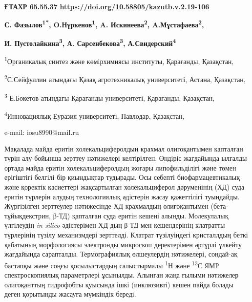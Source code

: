 \clearpage
{\bfseries ҒТАХР 65.55.37}\hfill
\hfill {\bfseries \href{https://doi.org/10.58805/kazutb.v.2.19-106}{https://doi.org/10.58805/kazutb.v.2.19-106}}


\begin{center}
{\bfseries С. Фазылов\textsuperscript{1*}, O.Нүркенов\textsuperscript{1},
A. Искинеева\textsuperscript{2}, A.Мұстафаева\textsuperscript{2},}

{\bfseries И. Пустолайкина\textsuperscript{3}, А.
Сарсенбекова\textsuperscript{3}, А.Свидерский\textsuperscript{4}}

\textsuperscript{1}Органикалық синтез және көмірхимиясы институты,
Қарағанды, Қазақстан,

\textsuperscript{2}С.Сейфуллин атындағы Қазақ агротехникалық
университеті, Астана, Қазақстан,

\textsuperscript{3} Е.Бөкетов атындағы Қарағанды университеті,
Қарағанды, Қазақстан,

\textsuperscript{4}Инновациялық Еуразия университеті, Павлодар,
Қазақстан,

e-mail: iosu8990@mail.ru
\end{center}

Мақалада майда еритін холекальциферолдың крахмал олигоқантымен капталған
түрін алу бойынша зерттеу нәтижелері келтірілген. Өндіріс жағдайында
ылғалды ортада майда еритін холекальциферолдың жоғары липофильділігі
және төмен ерігіштігі белгілі бір қиындықтар тудырады. Осы себепті
биофармацевтикалық және қоректік қасиеттері жақсартылған холекальциферол
дәруменінің (ХД) суда еритін түрлерін алудың технологиялық әдістерін
жасау қажеттілігі туындайды. Жүргізілген зерттеулер нәтижесінде ХД
крахмалдың олигоқантымен (бета-тұйықдекстрин, β-ТД) қапталған суда
еритін кешені алынды. Молекулалық үлгілеудің \emph{in silico}
әдістерімен ХД-дың β-ТД-мен кешендерінің клатратты түрлерінің түзілу
механизмдері зерттелді. Клатрат түзілуіндегі кристаллдың беткі қабатының
морфологиясы электронды микроскоп деректерімен әртүрлі үлкейту
жағдайында сарапталды. Термографиялық өлшеулердің нәтижелері, сондай-ақ
бастапқы және соңғы қосылыстардың салыстырмалы \textsuperscript{1}Н және
\textsuperscript{13}С ЯМР спектроскопиялық параметрлері ұсынылды.
Алынған жаңа ғылыми нәтижелер олигоқанттың гидрофобты қуысында ішкі
(инклюзивті) кешен пайда болады деген қорытынды жасауға мүмкіндік
береді.

